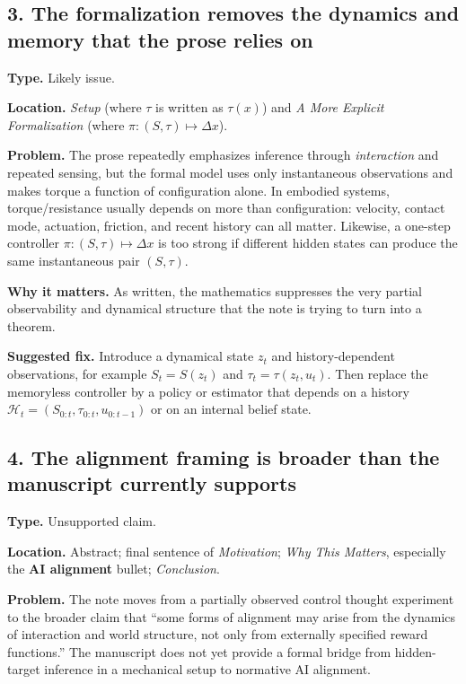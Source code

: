 \documentclass[11pt]{article}
\begin{document}
\subsection*{3. The formalization removes the dynamics and memory that the prose relies on}

\textbf{Type.} Likely issue.

\textbf{Location.} \emph{Setup} (where $\tau$ is written as $\tau(x)$) and \emph{A More Explicit Formalization} (where $\pi:(S,\tau)\mapsto \Delta x$).

\textbf{Problem.} The prose repeatedly emphasizes inference through \emph{interaction} and repeated sensing, but the formal model uses only instantaneous observations and makes torque a function of configuration alone. In embodied systems, torque/resistance usually depends on more than configuration: velocity, contact mode, actuation, friction, and recent history can all matter. Likewise, a one-step controller $\pi:(S,\tau)\mapsto \Delta x$ is too strong if different hidden states can produce the same instantaneous pair $(S,\tau)$.

\textbf{Why it matters.} As written, the mathematics suppresses the very partial observability and dynamical structure that the note is trying to turn into a theorem.

\textbf{Suggested fix.} Introduce a dynamical state $z_t$ and history-dependent observations, for example $S_t=S(z_t)$ and $\tau_t=\tau(z_t,u_t)$. Then replace the memoryless controller by a policy or estimator that depends on a history $\mathcal{H}_t=(S_{0:t},\tau_{0:t},u_{0:t-1})$ or on an internal belief state.

\subsection*{4. The alignment framing is broader than the manuscript currently supports}

\textbf{Type.} Unsupported claim.

\textbf{Location.} Abstract; final sentence of \emph{Motivation}; \emph{Why This Matters}, especially the \textbf{AI alignment} bullet; \emph{Conclusion}.

\textbf{Problem.} The note moves from a partially observed control thought experiment to the broader claim that ``some forms of alignment may arise from the dynamics of interaction and world structure, not only from externally specified reward functions.'' The manuscript does not yet provide a formal bridge from hidden-target inference in a mechanical setup to normative AI alignment.
\end{document}
